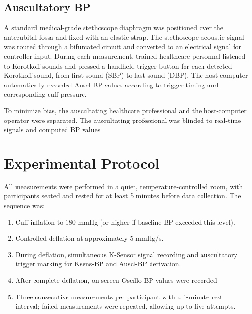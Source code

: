 \documentclass[
  12pt,
  letterpaper,
  openany,
  oneside]{book}
\providecommand{\tightlist}{%
  \setlength{\itemsep}{0pt}\setlength{\parskip}{0pt}}
\begin{document}
\subsection{Auscultatory BP}\label{auscultatory-bp}

A standard medical-grade stethoscope diaphragm was positioned over the
antecubital fossa and fixed with an elastic strap. The stethoscope
acoustic signal was routed through a bifurcated circuit and converted to
an electrical signal for controller input. During each measurement,
trained healthcare personnel listened to Korotkoff sounds and pressed a
handheld trigger button for each detected Korotkoff sound, from first
sound (SBP) to last sound (DBP). The host computer automatically
recorded Auscl-BP values according to trigger timing and corresponding
cuff pressure.

To minimize bias, the auscultating healthcare professional and the
host-computer operator were separated. The auscultating professional was
blinded to real-time signals and computed BP values.

\section{Experimental Protocol}\label{experimental-protocol}

All measurements were performed in a quiet, temperature-controlled room,
with participants seated and rested for at least 5 minutes before data
collection. The sequence was:

\begin{enumerate}
\def\labelenumi{\arabic{enumi}.}
\tightlist
\item
  Cuff inflation to 180 mmHg (or higher if baseline BP exceeded this
  level).
\item
  Controlled deflation at approximately 5 mmHg/s.
\item
  During deflation, simultaneous K-Sensor signal recording and
  auscultatory trigger marking for Ksens-BP and Auscl-BP derivation.
\item
  After complete deflation, on-screen Oscillo-BP values were recorded.
\item
  Three consecutive measurements per participant with a 1-minute rest
  interval; failed measurements were repeated, allowing up to five
  attempts.
\end{enumerate}
\end{document}
